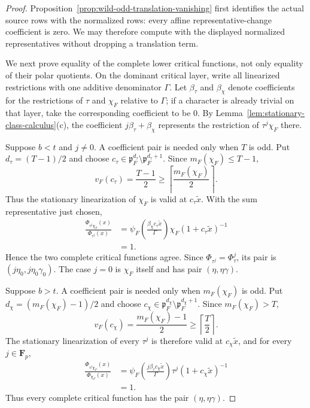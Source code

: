\documentclass[11pt]{amsart}
\theoremstyle{definition}
\theoremstyle{remark}
\newcommand{\F}{\mathbf F}
\newcommand{\p}{\mathfrak p}
\begin{document}
\begin{proof}
Proposition~\ref{prop:wild-odd-translation-vanishing} first identifies
the actual source rows with the normalized rows: every affine
representative-change coefficient is zero.  We may therefore compute
with the displayed normalized representatives without dropping a
translation term.

We next prove equality of the complete lower critical functions, not
only equality of their polar quotients.  On the dominant critical
layer, write all linearized restrictions with one additive denominator
$\Gamma$.  Let $\beta_\tau$ and $\beta_\chi$ denote coefficients for
the restrictions of $\tau$ and $\chi_F$ relative to $\Gamma$; if a
character is already trivial on that layer, take the corresponding
coefficient to be $0$.  By
Lemma~\ref{lem:stationary-class-calculus}(c), the coefficient
$j\beta_\tau+\beta_\chi$ represents the restriction of
$\tau^j\chi_F$ there.

Suppose $b<t$ and $j\ne0$.  A coefficient pair is needed only when
$T$ is odd.  Put $d_\tau=(T-1)/2$ and choose
$c_\tau\in\p_F^{d_\tau}\setminus\p_F^{d_\tau+1}$.  Since
$m_F(\chi_F)\le T-1$,
\[
 v_F(c_\tau)=\frac{T-1}{2}
 \ge\left\lceil\frac{m_F(\chi_F)}2\right\rceil.
\]
Thus the stationary linearization of $\chi_F$ is valid at
$c_\tau\widetilde x$.  With the sum representative just chosen,
\begin{align*}
 \frac{\Phi_{\tau^j\chi_F}(x)}{\Phi_{\tau^j}(x)}
 &=\psi_F\!\left(
   \frac{\beta_\chi c_\tau\widetilde x}{\Gamma}
  \right)
   \chi_F(1+c_\tau\widetilde x)^{-1}\\
 &=1.
\end{align*}
Hence the two complete critical functions agree.  Since
$\Phi_{\tau^j}=\Phi_\tau^j$, its pair is
$(j\eta_0,j\eta_0\gamma_0)$.  The case $j=0$ is $\chi_F$ itself and
has pair $(\eta,\eta\gamma)$.

Suppose $b>t$.  A coefficient pair is needed only when
$m_F(\chi_F)$ is odd.  Put
$d_\chi=(m_F(\chi_F)-1)/2$ and choose
$c_\chi\in\p_F^{d_\chi}\setminus\p_F^{d_\chi+1}$.  Since
$m_F(\chi_F)>T$,
\[
 v_F(c_\chi)=\frac{m_F(\chi_F)-1}{2}
 \ge\left\lceil\frac T2\right\rceil.
\]
The stationary linearization of every $\tau^j$ is therefore valid at
$c_\chi\widetilde x$, and for every $j\in\F_p$,
\begin{align*}
 \frac{\Phi_{\tau^j\chi_F}(x)}{\Phi_{\chi_F}(x)}
 &=\psi_F\!\left(
   \frac{j\beta_\tau c_\chi\widetilde x}{\Gamma}
  \right)
   \tau^j(1+c_\chi\widetilde x)^{-1}\\
 &=1.
\end{align*}
Thus every complete critical function has the pair
$(\eta,\eta\gamma)$.


\end{proof}
\end{document}

